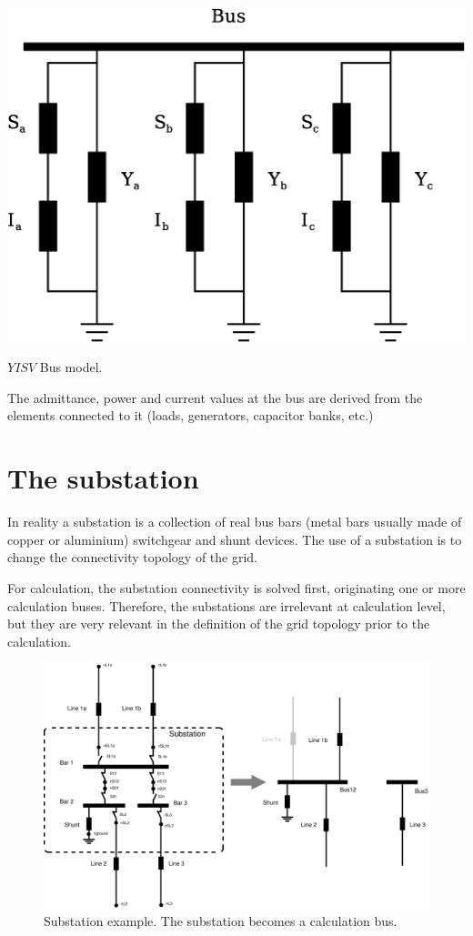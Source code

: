 \documentclass[nols,a4paper,twoside,notoc,fleqn]{tufte-book}
\begin{document}
\begin{marginfigure}
	\includegraphics[width=0.99\linewidth]{img/NodeElements.eps}
	\caption{$YISV$ Bus model.}
	\label{bus_model}
\end{marginfigure}

The admittance, power and current values at the bus are derived from the elements connected to it (loads, generators, capacitor banks, etc.)


\section{The substation}

In reality a substation is a collection of real bus bars (metal bars usually made of copper or aluminium) switchgear and shunt devices. The use of a substation is to change the connectivity topology of the grid.

For calculation, the substation connectivity is solved first, originating one or more calculation buses. Therefore, the substations are irrelevant at calculation level, but they are very relevant in the definition of the grid topology prior to the calculation.

\begin{figure}
	\includegraphics[width=0.99\linewidth]{img/Substation.eps}
	\caption{Substation example. The substation becomes a calculation bus.}
	\label{substation_model}
\end{figure}
\end{document}
